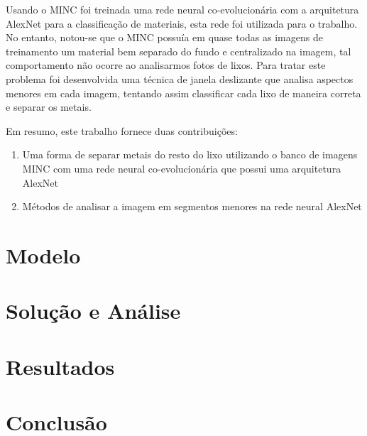 \documentclass[conference, compsoc, 12pt]{IEEEtran}
\begin{document}
Usando o MINC foi treinada uma rede neural co-evolucionária com a arquitetura AlexNet para a classificação de materiais, esta rede foi utilizada para o trabalho. No entanto, notou-se que o MINC possuía em quase todas as imagens de treinamento um material bem separado do fundo e centralizado na imagem, tal comportamento não ocorre ao analisarmos fotos de lixos. Para tratar este problema foi desenvolvida uma técnica de janela deslizante que analisa aspectos menores em cada imagem, tentando assim classificar cada lixo de maneira correta e separar os metais.

Em resumo, este trabalho fornece duas contribuições:

\begin{enumerate}
    \item Uma forma de separar metais do resto do lixo utilizando o banco de imagens MINC com uma rede neural co-evolucionária que possui uma arquitetura AlexNet
    \item Métodos de analisar a imagem em segmentos menores na rede neural AlexNet 
\end{enumerate}


\section{Modelo}

\section{Solução e Análise}

\section{Resultados}

\section{Conclusão}



\end{document}
